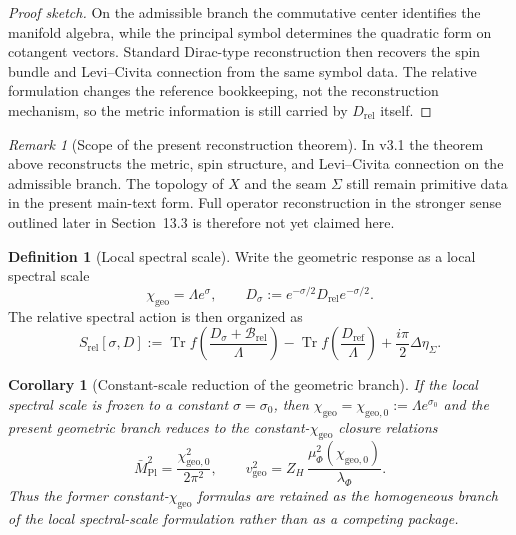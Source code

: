 \documentclass[11pt,a4paper]{article}
\newtheorem{corollary}[theorem]{Corollary}
\theoremstyle{definition}
\newtheorem{definition}[theorem]{Definition}
\theoremstyle{remark}
\newtheorem*{remark}{Remark}
\DeclareMathOperator{\tr}{Tr}
\newcommand{\Seam}{\Sigma}
\newcommand{\Mpl}{\bar M_{\mathrm{Pl}}}
\newcommand{\chigeo}{\chi_{\mathrm{geo}}}
\newcommand{\chigeozero}{\chi_{\mathrm{geo},0}}
\newcommand{\vgeo}{v_{\mathrm{geo}}}
\begin{document}
\begin{proof}[Proof sketch]
On the admissible branch the commutative center identifies the manifold algebra, while the principal symbol determines the quadratic form on cotangent vectors. Standard Dirac-type reconstruction then recovers the spin bundle and Levi--Civita connection from the same symbol data. The relative formulation changes the reference bookkeeping, not the reconstruction mechanism, so the metric information is still carried by $D_{\mathrm{rel}}$ itself.
\end{proof}

\begin{remark}[Scope of the present reconstruction theorem]
In v3.1 the theorem above reconstructs the metric, spin structure, and Levi--Civita connection on the admissible branch. The topology of $X$ and the seam $\Seam$ still remain primitive data in the present main-text form. Full operator reconstruction in the stronger sense outlined later in Section~13.3 is therefore not yet claimed here.
\end{remark}

\begin{definition}[Local spectral scale]
\label{def:local-spectral-scale}
Write the geometric response as a local spectral scale
\[
\chigeo=\Lambda e^\sigma,
\qquad
D_\sigma:=e^{-\sigma/2}D_{\mathrm{rel}}e^{-\sigma/2}.
\]
The relative spectral action is then organized as
\[
S_{\mathrm{rel}}[\sigma,D]
:=
\tr f\!\left(\frac{D_\sigma+\mathcal B_{\mathrm{rel}}}{\Lambda}\right)
-\tr f\!\left(\frac{D_{\mathrm{ref}}}{\Lambda}\right)
+\frac{i\pi}{2}\Delta\eta_\Sigma.
\]
\end{definition}

\begin{corollary}[Constant-scale reduction of the geometric branch]
\label{cor:constant-scale-reduction}
If the local spectral scale is frozen to a constant $\sigma=\sigma_0$, then $\chigeo=\chigeozero:=\Lambda e^{\sigma_0}$ and the present geometric branch reduces to the constant-$\chigeo$ closure relations
\[
\Mpl^2=\frac{\chigeozero^2}{2\pi^2},
\qquad
\vgeo^2=Z_H\,\frac{\mu_\Phi^2(\chigeozero)}{\lambda_\Phi}.
\]
Thus the former constant-$\chigeo$ formulas are retained as the homogeneous branch of the local spectral-scale formulation rather than as a competing package.
\end{corollary}
\end{document}
